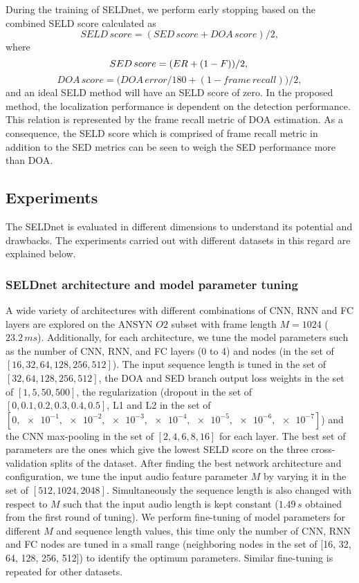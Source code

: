 \documentclass[journal]{IEEEtran}
\begin{document}
During the training of SELDnet, we perform early stopping based on the combined SELD score calculated as
\begin{equation}
SELD\,score = (SED\,score + DOA\,score)/2,
\end{equation}
where
\small
\begin{equation}
SED\,score = (ER + (1-F))/2, \\
\end{equation}
\begin{equation}
DOA\,score = \big(DOA\,error / 180 + (1 - frame\,recall)\big)/2,
\end{equation}
\normalsize
and an ideal SELD method will have an SELD score of zero. In the proposed method, the localization performance is dependent on the detection performance. This relation is represented by the frame recall metric of DOA estimation. As a consequence, the SELD score which is comprised of frame recall metric in addition to the SED metrics can be seen to weigh the SED performance more than DOA.

\subsection{Experiments}
\label{ssec:experiments}
The SELDnet is evaluated in different dimensions to understand its potential and drawbacks. The experiments carried out with different datasets in this regard are explained below.

\subsubsection{SELDnet architecture and model parameter tuning} \label{sssec:cv}
A wide variety of architectures with different combinations of CNN, RNN and FC layers are explored on the ANSYN $O2$ subset with frame length $M=1024$ ($23.2\, ms$). Additionally, for each architecture, we tune the model parameters such as the number of CNN, RNN, and FC layers (0 to 4) and nodes (in the set of $[16, 32, 64, 128, 256, 512]$). The input sequence length is tuned in the set of $[32, 64, 128, 256, 512]$, the DOA and SED branch output loss weights in the set of $[1, 5, 50, 500]$, the regularization (dropout in the set of $[0, 0.1, 0.2, 0.3, 0.4, 0.5]$, L1 and L2 in the set of $[0, \SI{e-1}, \SI{e-2}, \SI{e-3}, \SI{e-4}, \SI{e-5}, \SI{e-6}, \SI{e-7}]$) and the CNN max-pooling in the set of $[2, 4, 6, 8, 16]$ for each layer. The best set of parameters are the ones which give the lowest SELD score on the three cross-validation splits of the dataset. After finding the best network architecture and configuration, we tune the input audio feature parameter $M$ by varying it in the set of $[512, 1024, 2048]$. Simultaneously the sequence length is also changed with respect to $M$ such that the input audio length is kept constant ($1.49\,s$ obtained from the first round of tuning). We perform fine-tuning of model parameters for different $M$ and sequence length values, this time only the number of CNN, RNN and FC nodes are tuned in a small range (neighboring nodes in the set of [16, 32, 64, 128, 256, 512]) to identify the optimum parameters. Similar fine-tuning is repeated for other datasets.
\end{document}
